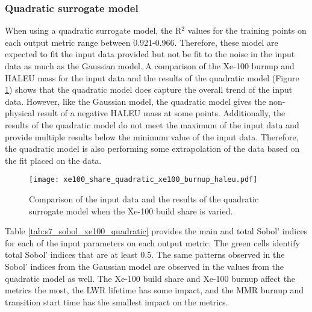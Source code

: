 \subsubsection{Quadratic surrogate model}
When using a quadratic surrogate model, the R$^2$ values for the training points on 
each output metric range between 0.921-0.966. Therefore, these model are  
expected to 
fit the input data provided but not be fit to the noise in the input data 
as much as the Gaussian model. A comparison of the Xe-100 burnup and \gls{HALEU} 
mass for the input data and the results of the quadratic model (Figure 
\ref{fig:s7_xe100_quadratic}) shows that the quadratic model does 
capture the overall trend of the input data. However, like the Gaussian model, 
the quadratic model gives the non-physical result of a negative \gls{HALEU} mass
at some points. Additionally, 
the results of the quadratic model do not meet the maximum of the input data and 
provide multiple results below the minimum value of the input data. Therefore, 
the quadratic model is also performing some extrapolation of the data based on the 
fit placed on the data.

\begin{figure}[h!]
    \centering 
    \texttt{[image: xe100\_share\_quadratic\_xe100\_burnup\_haleu.pdf]}
    \caption{Comparison of the input data and the results of the quadratic 
    surrogate model when the Xe-100 build share is varied.}
    \label{fig:s7_xe100_quadratic}
\end{figure}

Table \ref{tab:s7_sobol_xe100_quadratic} provides the main and total Sobol' 
indices for each of the input parameters on each output metric. The 
green cells identify total Sobol' indices that are at least 0.5. The same patterns 
observed in the Sobol' indices from the Gaussian model are 
observed in the values from the quadratic model as well. The Xe-100 build share 
and Xe-100 burnup affect the metrics the most, the \gls{LWR} lifetime has some 
impact, and the \gls{MMR} burnup and transition start time has the smallest impact 
on the metrics. 

